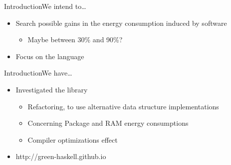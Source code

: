 
    \begin{frame}{Introduction}{We intend to\ldots}

        \begin{itemize}

            \item<1> Search possible gains in the energy consumption induced by software

            \begin{itemize}

                \item Maybe between 30\% and 90\%?

            \end{itemize}

            \item<2> Focus on the \Haskell language


        \end{itemize}

    \end{frame}



    \begin{frame}{Introduction}{We have\ldots}

        \begin{itemize}

            \item Investigated the \Edison library

            \begin{itemize}

                \item Refactoring, to use alternative data structure implementations

                \item Concerning Package and RAM energy consumptions

		\item Compiler optimizations effect


            \end{itemize}

            \item http://green-haskell.github.io


        \end{itemize}


    \end{frame}


